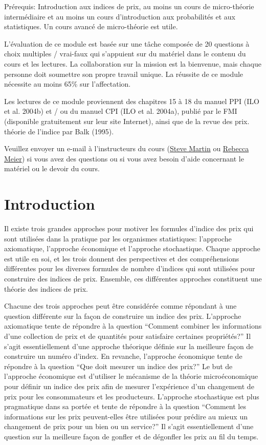 \documentclass[]{article}
\begin{document}
Prérequis: Introduction aux indices de prix, au moins un cours de micro-théorie intermédiaire et au moins un cours d'introduction aux probabilités et aux statistiques. Un cours avancé de micro-théorie est utile.

L'évaluation de ce module est basée sur une tâche composée de 20 questions à choix multiples / vrai-faux qui s'appuient sur du matériel dans le contenu du cours et les lectures. La collaboration sur la mission est la bienvenue, mais chaque personne doit soumettre son propre travail unique. La réussite de ce module nécessite au moins 65\% sur l'affectation.

Les lectures de ce module proviennent des chapitres 15 à 18 du manuel PPI (ILO et al. 2004b) et / ou du manuel CPI (ILO et al. 2004a), publié par le FMI (disponible gratuitement sur leur site Internet), ainsi que de la revue des prix. théorie de l'indice par Balk (1995).

Veuillez envoyer un e-mail à l'instructeurs du cours (\href{mailto:steve.martin5@canada.ca}{Steve Martin} ou \href{mailto:rebecca.meier@canada.ca}{Rebecca Meier}) si vous avez des questions ou si vous avez besoin d'aide concernant le matériel ou le devoir du cours.

\hypertarget{introduction}{%
\section{Introduction}\label{introduction}}

Il existe trois grandes approches pour motiver les formules d'indice des prix qui sont utilisées dans la pratique par les organismes statistiques: l'approche axiomatique, l'approche économique et l'approche stochastique. Chaque approche est utile en soi, et les trois donnent des perspectives et des compréhensions différentes pour les diverses formules de nombre d'indices qui sont utilisées pour construire des indices de prix. Ensemble, ces différentes approches constituent une théorie des indices de prix.

Chacune des trois approches peut être considérée comme répondant à une question différente sur la façon de construire un indice des prix. L'approche axiomatique tente de répondre à la question ``Comment combiner les informations d'une collection de prix et de quantités pour satisfaire certaines propriétés?'' Il s'agit essentiellement d'une approche théorique définie sur la meilleure façon de construire un numéro d'index. En revanche, l'approche économique tente de répondre à la question ``Que doit mesurer un indice des prix?'' Le but de l'approche économique est d'utiliser le mécanisme de la théorie microéconomique pour définir un indice des prix afin de mesurer l'expérience d'un changement de prix pour les consommateurs et les producteurs. L'approche stochastique est plus pragmatique dans sa portée et tente de répondre à la question ``Comment les informations sur les prix peuvent-elles être utilisées pour prédire au mieux un changement de prix pour un bien ou un service?'' Il s'agit essentiellement d'une question sur la meilleure façon de gonfler et de dégonfler les prix au fil du temps.
\end{document}
